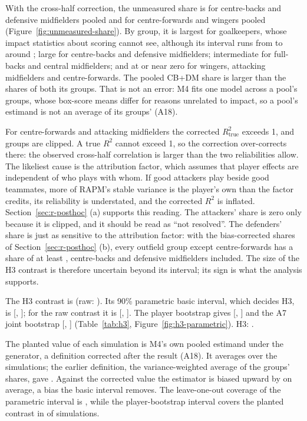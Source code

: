 \documentclass[11pt,a4paper]{article}
\begin{document}
With the cross-half correction, the unmeasured share is \ShareHigh{} for
centre-backs and defensive midfielders pooled and \ShareLow{} for
centre-forwards and wingers pooled (Figure~\ref{fig:unmeasured-share}). By
group, it is largest for goalkeepers, whose impact statistics about scoring
cannot see, although its interval runs from \ShareGKLo{} to \ShareGKHi{}
around \ShareGK{}; large for centre-backs and defensive midfielders;
intermediate for full-backs and central midfielders; and at or near zero for
wingers, attacking midfielders and centre-forwards. The pooled CB+DM share is
larger than the shares of both its groups. That is not an error: M4 fits one
model across a pool's groups, whose box-score means differ for reasons
unrelated to impact, so a pool's estimand is not an average of its groups'
(A18).

For centre-forwards and attacking midfielders the corrected $R^2_{\text{true}}$
exceeds 1, and \NGroupsClipped{} groups are clipped. A true $R^2$ cannot exceed
1, so the correction over-corrects there: the observed cross-half correlation
is larger than the two reliabilities allow. The likeliest cause is the
attribution factor, which assumes that player effects are independent of who
plays with whom. If good attackers play beside good teammates, more of RAPM's
stable variance is the player's own than the factor credits, its reliability
is understated, and the corrected $R^2$ is inflated.
Section~\ref{sec:r-posthoc} (a) supports this reading. The attackers' share
is zero only because it is clipped, and it should be read as ``not
resolved''. The defenders' share is just as sensitive to the attribution
factor: with the bias-corrected shares of Section~\ref{sec:r-posthoc} (b), every
outfield group except centre-forwards has a share of at least
\BiasShareOtherLo{}, centre-backs and defensive midfielders included. The size
of the H3 contrast is therefore uncertain beyond its interval; its sign is
what the analysis supports.

The H3 contrast is \ShareContrast{} (raw: \ShareContrastRaw{}). Its 90\%
parametric basic interval, which decides H3, is
[\ShareContrastParamLo, \ShareContrastParamHi]; for the raw contrast it is
[\ShareContrastParamRawLo, \ShareContrastParamRawHi]. The player bootstrap gives
[\ShareContrastPlayerLo, \ShareContrastPlayerHi] and the A7 joint bootstrap
[\ShareContrastJointLo, \ShareContrastJointHi] (Table~\ref{tab:h3},
Figure~\ref{fig:h3-parametric}). H3: \VerdictHThree{}.

The planted value of each simulation is M4's own pooled estimand under the
generator, a definition corrected after the result (A18). It averages
\HThreePlanted{} over the simulations; the earlier definition, the
variance-weighted average of the groups' shares, gave \HThreePlantedWeighted{}.
Against the corrected value the estimator is biased upward by
\HThreeMeanError{} on average, a bias the basic interval removes. The
leave-one-out coverage of the parametric interval is \ParamCoverageLoo{}, while
the player-bootstrap interval covers the planted contrast in
\ParamCoverageMFour{} of simulations.
\end{document}

